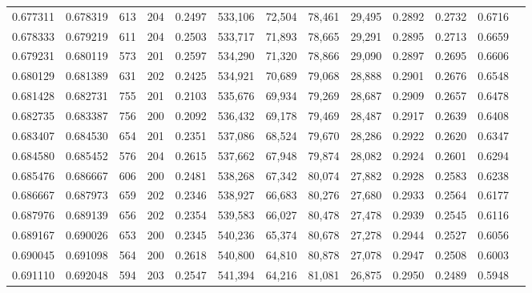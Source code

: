 \begin{tabular}{rrrrrrrrrrrrr}
0.677311 & 0.678319 &    613 &   204 &                                     0.2497 & 533,106 &  72,504 &  78,461 &  29,495 & 0.2892 & 0.2732 & 0.6716 \\
0.678333 & 0.679219 &    611 &   204 &                                     0.2503 & 533,717 &  71,893 &  78,665 &  29,291 & 0.2895 & 0.2713 & 0.6659 \\
0.679231 & 0.680119 &    573 &   201 &                                     0.2597 & 534,290 &  71,320 &  78,866 &  29,090 & 0.2897 & 0.2695 & 0.6606 \\
0.680129 & 0.681389 &    631 &   202 &                                     0.2425 & 534,921 &  70,689 &  79,068 &  28,888 & 0.2901 & 0.2676 & 0.6548 \\
0.681428 & 0.682731 &    755 &   201 &                                     0.2103 & 535,676 &  69,934 &  79,269 &  28,687 & 0.2909 & 0.2657 & 0.6478 \\
0.682735 & 0.683387 &    756 &   200 &                                     0.2092 & 536,432 &  69,178 &  79,469 &  28,487 & 0.2917 & 0.2639 & 0.6408 \\
0.683407 & 0.684530 &    654 &   201 &                                     0.2351 & 537,086 &  68,524 &  79,670 &  28,286 & 0.2922 & 0.2620 & 0.6347 \\
0.684580 & 0.685452 &    576 &   204 &                                     0.2615 & 537,662 &  67,948 &  79,874 &  28,082 & 0.2924 & 0.2601 & 0.6294 \\
0.685476 & 0.686667 &    606 &   200 &                                     0.2481 & 538,268 &  67,342 &  80,074 &  27,882 & 0.2928 & 0.2583 & 0.6238 \\
0.686667 & 0.687973 &    659 &   202 &                                     0.2346 & 538,927 &  66,683 &  80,276 &  27,680 & 0.2933 & 0.2564 & 0.6177 \\
0.687976 & 0.689139 &    656 &   202 &                                     0.2354 & 539,583 &  66,027 &  80,478 &  27,478 & 0.2939 & 0.2545 & 0.6116 \\
0.689167 & 0.690026 &    653 &   200 &                                     0.2345 & 540,236 &  65,374 &  80,678 &  27,278 & 0.2944 & 0.2527 & 0.6056 \\
0.690045 & 0.691098 &    564 &   200 &                                     0.2618 & 540,800 &  64,810 &  80,878 &  27,078 & 0.2947 & 0.2508 & 0.6003 \\
0.691110 & 0.692048 &    594 &   203 &                                     0.2547 & 541,394 &  64,216 &  81,081 &  26,875 & 0.2950 & 0.2489 & 0.5948 \\

\end{tabular}
